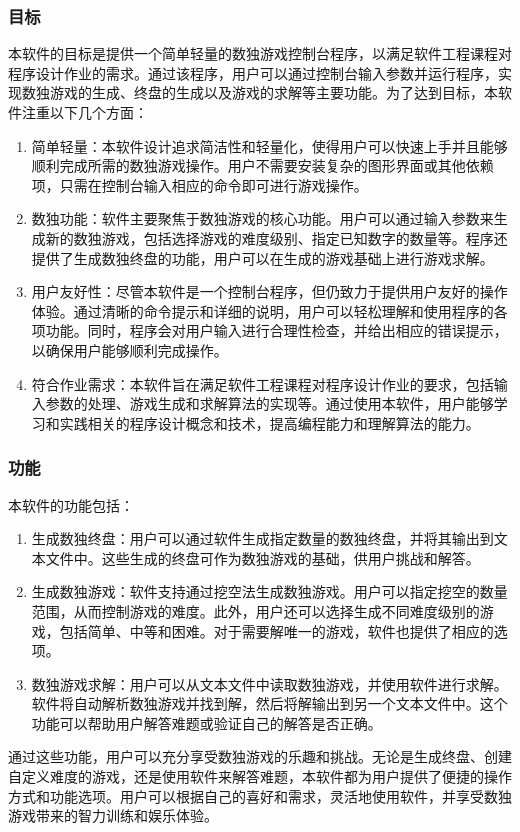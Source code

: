 \documentclass[a4paper]{article}
\begin{document}
\subsubsection{目标}
本软件的目标是提供一个简单轻量的数独游戏控制台程序，以满足软件工程课程对程序设计作业的需求。通过该程序，用户可以通过控制台输入参数并运行程序，实现数独游戏的生成、终盘的生成以及游戏的求解等主要功能。为了达到目标，本软件注重以下几个方面：
\begin{enumerate}
\item 简单轻量：本软件设计追求简洁性和轻量化，使得用户可以快速上手并且能够顺利完成所需的数独游戏操作。用户不需要安装复杂的图形界面或其他依赖项，只需在控制台输入相应的命令即可进行游戏操作。
\item 数独功能：软件主要聚焦于数独游戏的核心功能。用户可以通过输入参数来生成新的数独游戏，包括选择游戏的难度级别、指定已知数字的数量等。程序还提供了生成数独终盘的功能，用户可以在生成的游戏基础上进行游戏求解。
\item 用户友好性：尽管本软件是一个控制台程序，但仍致力于提供用户友好的操作体验。通过清晰的命令提示和详细的说明，用户可以轻松理解和使用程序的各项功能。同时，程序会对用户输入进行合理性检查，并给出相应的错误提示，以确保用户能够顺利完成操作。
\item 符合作业需求：本软件旨在满足软件工程课程对程序设计作业的要求，包括输入参数的处理、游戏生成和求解算法的实现等。通过使用本软件，用户能够学习和实践相关的程序设计概念和技术，提高编程能力和理解算法的能力。

\end{enumerate}

\subsubsection{功能}
本软件的功能包括：
\begin{enumerate}
\item 生成数独终盘：用户可以通过软件生成指定数量的数独终盘，并将其输出到文本文件中。这些生成的终盘可作为数独游戏的基础，供用户挑战和解答。
\item 生成数独游戏：软件支持通过挖空法生成数独游戏。用户可以指定挖空的数量范围，从而控制游戏的难度。此外，用户还可以选择生成不同难度级别的游戏，包括简单、中等和困难。对于需要解唯一的游戏，软件也提供了相应的选项。
\item 数独游戏求解：用户可以从文本文件中读取数独游戏，并使用软件进行求解。软件将自动解析数独游戏并找到解，然后将解输出到另一个文本文件中。这个功能可以帮助用户解答难题或验证自己的解答是否正确。
\end{enumerate}
通过这些功能，用户可以充分享受数独游戏的乐趣和挑战。无论是生成终盘、创建自定义难度的游戏，还是使用软件来解答难题，本软件都为用户提供了便捷的操作方式和功能选项。用户可以根据自己的喜好和需求，灵活地使用软件，并享受数独游戏带来的智力训练和娱乐体验。
\end{document}
